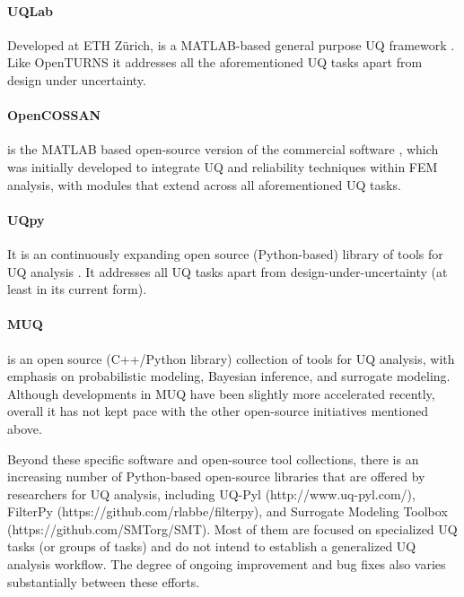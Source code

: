 \paragraph{UQLab} Developed at ETH Zürich,  is a MATLAB-based general purpose UQ framework \citep{marelli2014uqlab}. Like OpenTURNS it addresses all the aforementioned UQ tasks apart from design under uncertainty. 

\paragraph{OpenCOSSAN} 
 is the MATLAB based open-source version of the commercial software  \citep{patelli2017cossan}, which was initially developed to integrate UQ and reliability techniques within FEM analysis, with modules that extend across all aforementioned UQ tasks.

\paragraph{UQpy} It is an continuously expanding open source (Python-based) library of tools for UQ analysis \citep{olivier2020uqpy}. It addresses all UQ tasks apart from design-under-uncertainty (at least in its current form).

\paragraph{MUQ} 
 is an open source (C++/Python library) collection of tools for UQ analysis, with emphasis on probabilistic modeling, Bayesian inference, and surrogate modeling. Although developments in MUQ have been slightly more accelerated recently, overall it has not kept pace with the other open-source initiatives mentioned above.


Beyond these specific software and open-source tool collections, there is an increasing number of Python-based open-source libraries that are offered by researchers for UQ analysis, including UQ-Pyl (http://www.uq-pyl.com/), FilterPy (https://github.com/rlabbe/filterpy), and Surrogate Modeling Toolbox (https://github.com/SMTorg/SMT). Most of them are focused on specialized UQ tasks (or groups of tasks) and do not intend to establish a generalized UQ analysis workflow. The degree of ongoing improvement and bug fixes also varies substantially between these efforts. 